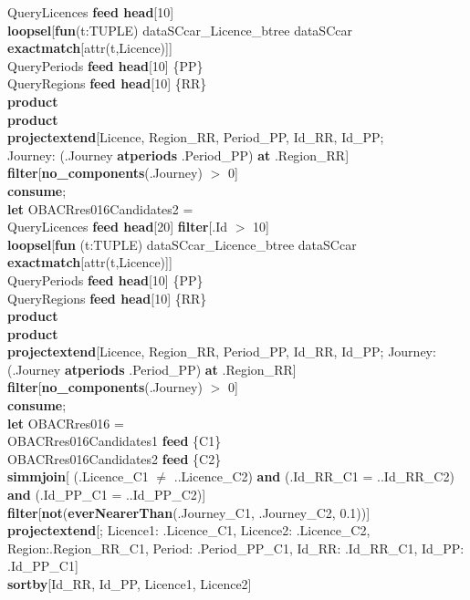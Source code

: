 \documentclass[a4paper]{article}
\newcommand{\op}[1]{\textbf{#1}}
\begin{document}
\begin{scriptsize}
\begin{tabbing}
\>QueryLicences \op{feed head}[10]\\
\>\>\op{loopsel}[\op{fun}(t:TUPLE) dataSCcar\_Licence\_btree dataSCcar \op{exactmatch}[attr(t,Licence)]]\\
\>QueryPeriods \op{feed head}[10] \{PP\}\\
\>QueryRegions \op{feed head}[10] \{RR\}\\
\>\op{product}\\
\>\op{product}\\
\>\op{projectextend}[Licence, Region\_RR, Period\_PP, Id\_RR, Id\_PP;\\
\>\>\>Journey: (.Journey \op{atperiods} .Period\_PP) \op{at} .Region\_RR]\\
\>\op{filter}[\op{no\_components}(.Journey) $>$ 0]\\
\op{consume};\\
\op{let} OBACRres016Candidates2 =\\
\>QueryLicences \op{feed head}[20] \op{filter}[.Id $>$ 10]\\
\>\op{loopsel}[\op{fun} (t:TUPLE) dataSCcar\_Licence\_btree dataSCcar \op{exactmatch}[attr(t,Licence)]]\\
\>QueryPeriods \op{feed head}[10] \{PP\}\\
\>QueryRegions \op{feed head}[10] \{RR\}\\
\>\op{product}\\
\>\op{product}\\
\>\op{projectextend}[Licence, Region\_RR, Period\_PP, Id\_RR, Id\_PP; Journey: (.Journey \op{atperiods} .Period\_PP) \op{at} .Region\_RR]\\
\>\op{filter}[\op{no\_components}(.Journey) $>$ 0]\\
\op{consume};\\
\op{let} OBACRres016 =\\
\>OBACRres016Candidates1 \op{feed} \{C1\}\\
\>OBACRres016Candidates2 \op{feed} \{C2\}\\
\>\op{simmjoin}[ (.Licence\_C1 $\neq$ ..Licence\_C2) \op{and} (.Id\_RR\_C1 = ..Id\_RR\_C2) \op{and} (.Id\_PP\_C1 = ..Id\_PP\_C2)]\\
\>\op{filter}[\op{not}(\op{everNearerThan}(.Journey\_C1, .Journey\_C2, 0.1))]\\
\>\op{projectextend}[; Licence1: .Licence\_C1, Licence2: .Licence\_C2, Region:.Region\_RR\_C1, Period: .Period\_PP\_C1, Id\_RR: .Id\_RR\_C1, Id\_PP: .Id\_PP\_C1]\\
\>\op{sortby}[Id\_RR, Id\_PP, Licence1, Licence2]\\

\end{tabbing}
\end{scriptsize}
\end{document}
